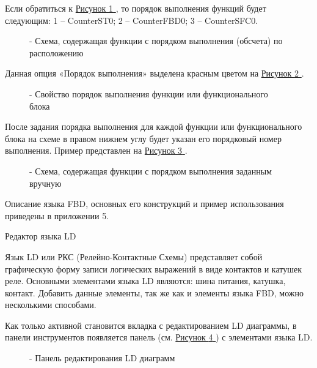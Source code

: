\documentclass[letterpaper,10pt,russian]{sphinxmanual}
\begin{document}
Если обратиться к \hyperref[usage_guide/ide_components:image68]{Рисунок \ref{usage_guide/ide_components:image68} }, то порядок выполнения функций будет
следующим: 1 – CounterST0; 2 – CounterFBD0; 3 – CounterSFC0.
\begin{figure}[htbp]
\centering
\capstart

\noindent{}
\caption{- Схема, содержащая функции с порядком выполнения (обсчета) по расположению}\label{usage_guide/ide_components:image68}\end{figure}

Данная опция «Порядок выполнения» выделена красным цветом на \hyperref[usage_guide/ide_components:image69]{Рисунок \ref{usage_guide/ide_components:image69} }.
\begin{figure}[htbp]
\centering
\capstart

\noindent{}
\caption{- Свойство порядок выполнения функции или функционального блока}\label{usage_guide/ide_components:image69}\end{figure}

После задания порядка выполнения для каждой функции или функционального
блока на схеме в правом нижнем углу будет указан его порядковый номер
выполнения. Пример представлен на \hyperref[usage_guide/ide_components:image70]{Рисунок \ref{usage_guide/ide_components:image70} }.
\begin{figure}[htbp]
\centering
\capstart

\noindent{}
\caption{- Схема, содержащая функции с порядком выполнения заданным вручную}\label{usage_guide/ide_components:image70}\end{figure}

Описание языка FBD, основных его конструкций и пример использования
приведены в приложении 5.

Редактор языка LD

Язык LD или РКС (Релейно-Контактные Схемы) представляет собой
графическую форму записи логических выражений в виде контактов и катушек
реле. Основными элементами языка LD являются: шина питания, катушка,
контакт. Добавить данные элементы, так же как и элементы языка FBD,
можно несколькими способами.

Как только активной становится вкладка с редактированием LD диаграммы, в
панели инструментов появляется панель (см. \hyperref[usage_guide/ide_components:image71]{Рисунок \ref{usage_guide/ide_components:image71} }) с элементами языка
LD.
\begin{figure}[htbp]
\centering
\capstart

\noindent{}
\caption{- Панель редактирования LD диаграмм}\label{usage_guide/ide_components:image71}\end{figure}
\end{document}
